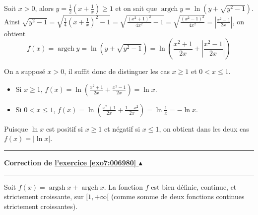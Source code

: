 \documentclass[11pt,a4paper]{article}
\renewcommand{\ge}{\geqslant} \renewcommand{\geq}{\geqslant}
\renewcommand{\le}{\leqslant} \renewcommand{\leq}{\leqslant}
\newcommand{\Argsh}{\mathop{\mathrm{argsh}}\nolimits}
\newcommand{\Argch}{\mathop{\mathrm{argch}}\nolimits}
\newcounter{exo}
\newcommand{\correction}[1]{\hypertarget{cor7:#1}{}\label{cor7:#1}{\bf Correction de \hyperlink{exo7:#1}{l'exercice \ref{exo7:#1} $\blacktriangle$}}\vspace{1mm}\hrule\vspace{1mm}}
\newcommand{\fincorrection}{\vspace{1mm}\hrule\vspace*{7mm}}
\begin{document}
\medskip

Soit $x>0$, alors $y=\frac{1}{2}\left(x+\frac{1}{x}\right)\ge 1$
et on sait que $\Argch y=\ln(y+\sqrt{y^2-1})$. Ainsi
$\sqrt{y^2-1}=\sqrt{\frac{1}{4}\left(x+\frac{1}{x}\right)^2-1}
=\sqrt{\frac{(x^2+1)^2}{4x^2}-1}=\sqrt{\frac{(x^2-1)^2}{4x^2}}
=\left|\frac{x^2-1}{2x}\right|$,
on obtient
$$f(x)=\Argch y=\ln(y+\sqrt{y^2-1})=\ln\left(\frac{x^2+1}{2x}+\left|\frac{x^2-1}{2x}\right|\right)$$


On a supposé $x>0$, il suffit donc de distinguer les cas $x\ge 1$ et $0<x\le 1$.
\begin{itemize}
  \item Si $x\ge 1$, $\displaystyle f(x)=\ln\left(\frac{x^2+1}{2x}+\frac{x^2-1}{2x}\right)=\ln x$.
  \item Si $0<x\le 1$, $\displaystyle f(x)=\ln\left(\frac{x^2+1}{2x}+\frac{1-x^2}{2x}\right)=\ln \frac{1}{x}=-\ln x$.
\end{itemize}

Puisque $\ln x$ est positif si $x\ge 1$ et négatif si $x\le 1$, 
on obtient dans les deux cas $f(x)=|\ln x|$.

\begin{center}
\end{center}

\fincorrection
\correction{006980}
Soit $f(x)=\Argsh x+\Argch x$. La fonction $f$ est bien définie, continue, et strictement croissante, 
sur $[1,+\infty[$ (comme somme de deux fonctions continues strictement croissantes). 
\end{document}
